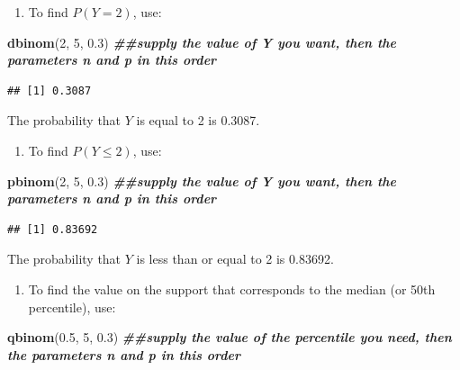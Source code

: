 \documentclass[
]{book}
\newenvironment{Shaded}{\begin{snugshade}}{\end{snugshade}}
\newcommand{\DecValTok}[1]{\textcolor[rgb]{0.00,0.00,0.81}{#1}}
\newcommand{\DocumentationTok}[1]{\textcolor[rgb]{0.56,0.35,0.01}{\textbf{\textit{#1}}}}
\newcommand{\FloatTok}[1]{\textcolor[rgb]{0.00,0.00,0.81}{#1}}
\newcommand{\FunctionTok}[1]{\textcolor[rgb]{0.13,0.29,0.53}{\textbf{#1}}}
\newcommand{\NormalTok}[1]{#1}
\providecommand{\tightlist}{%
  \setlength{\itemsep}{0pt}\setlength{\parskip}{0pt}}
\begin{document}
\begin{enumerate}
\def\labelenumi{\arabic{enumi}.}
\tightlist
\item
  To find \(P(Y=2)\), use:
\end{enumerate}

\begin{Shaded}
\begin{Highlighting}[]
\FunctionTok{dbinom}\NormalTok{(}\DecValTok{2}\NormalTok{, }\DecValTok{5}\NormalTok{, }\FloatTok{0.3}\NormalTok{) }\DocumentationTok{\#\#supply the value of Y you want, then the parameters n and p in this order}
\end{Highlighting}
\end{Shaded}

\begin{verbatim}
## [1] 0.3087
\end{verbatim}

The probability that \(Y\) is equal to 2 is 0.3087.

\begin{enumerate}
\def\labelenumi{\arabic{enumi}.}
\setcounter{enumi}{1}
\tightlist
\item
  To find \(P(Y \leq 2)\), use:
\end{enumerate}

\begin{Shaded}
\begin{Highlighting}[]
\FunctionTok{pbinom}\NormalTok{(}\DecValTok{2}\NormalTok{, }\DecValTok{5}\NormalTok{, }\FloatTok{0.3}\NormalTok{) }\DocumentationTok{\#\#supply the value of Y you want, then the parameters n and p in this order}
\end{Highlighting}
\end{Shaded}

\begin{verbatim}
## [1] 0.83692
\end{verbatim}

The probability that \(Y\) is less than or equal to 2 is 0.83692.

\begin{enumerate}
\def\labelenumi{\arabic{enumi}.}
\setcounter{enumi}{2}
\tightlist
\item
  To find the value on the support that corresponds to the median (or 50th percentile), use:
\end{enumerate}

\begin{Shaded}
\begin{Highlighting}[]
\FunctionTok{qbinom}\NormalTok{(}\FloatTok{0.5}\NormalTok{, }\DecValTok{5}\NormalTok{, }\FloatTok{0.3}\NormalTok{) }\DocumentationTok{\#\#supply the value of the percentile you need, then the parameters n and p in this order}
\end{Highlighting}
\end{Shaded}
\end{document}
